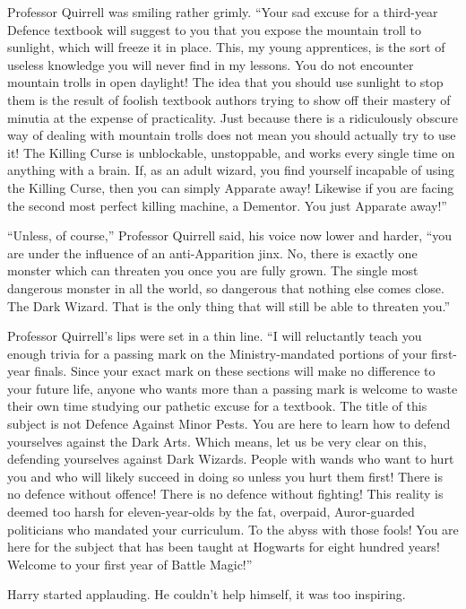 Professor Quirrell was smiling rather grimly. ``Your sad excuse for a
third-year Defence textbook will suggest to you that you expose the
mountain troll to sunlight, which will freeze it in place. This, my
young apprentices, is the sort of useless knowledge you will never find
in my lessons. You do not encounter mountain trolls in open daylight!
The idea that you should use sunlight to stop them is the result of
foolish textbook authors trying to show off their mastery of minutia at
the expense of practicality. Just because there is a ridiculously
obscure way of dealing with mountain trolls does not mean you should
actually try to use it! The Killing Curse is unblockable, unstoppable,
and works every single time on anything with a brain. If, as an adult
wizard, you find yourself incapable of using the Killing Curse, then you
can simply Apparate away! Likewise if you are facing the second most
perfect killing machine, a Dementor. You just Apparate away!''

``Unless, of course,'' Professor Quirrell said, his voice now lower and
harder, ``you are under the influence of an anti-Apparition jinx. No,
there is exactly one monster which can threaten you once you are fully
grown. The single most dangerous monster in all the world, so dangerous
that nothing else comes close. The Dark Wizard. That is the only thing
that will still be able to threaten you.''

Professor Quirrell's lips were set in a thin line. ``I will reluctantly
teach you enough trivia for a passing mark on the Ministry-mandated
portions of your first-year finals. Since your exact mark on these
sections will make no difference to your future life, anyone who wants
more than a passing mark is welcome to waste their own time studying our
pathetic excuse for a textbook. The title of this subject is not Defence
Against Minor Pests. You are here to learn how to defend yourselves
against the Dark Arts. Which means, let us be very clear on this,
defending yourselves against Dark Wizards. People with wands who want to
hurt you and who will likely succeed in doing so unless you hurt them
first! There is no defence without offence! There is no defence without
fighting! This reality is deemed too harsh for eleven-year-olds by the
fat, overpaid, Auror-guarded politicians who mandated your curriculum.
To the abyss with those fools! You are here for the subject that has
been taught at Hogwarts for eight hundred years! Welcome to your first
year of Battle Magic!''

Harry started applauding. He couldn't help himself, it was too
inspiring.

